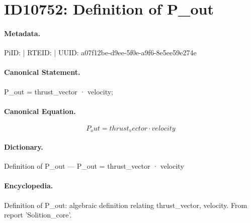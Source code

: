 \section*{ID10752: Definition of P\_out}
\paragraph{Metadata.}
PiID:  | RTEID:  | UUID: a07f12be-d9ee-5f0e-a9f6-8e5ee59e274e

\paragraph{Canonical Statement.}
P\_out = thrust\_vector · velocity;

\paragraph{Canonical Equation.}
\[
P_out = thrust_vector · velocity
\]

\paragraph{Dictionary.}
Definition of P\_out — P\_out = thrust\_vector · velocity

\paragraph{Encyclopedia.}
Definition of P\_out: algebraic definition relating thrust\_vector, velocity. From report 'Solition\_core'.
